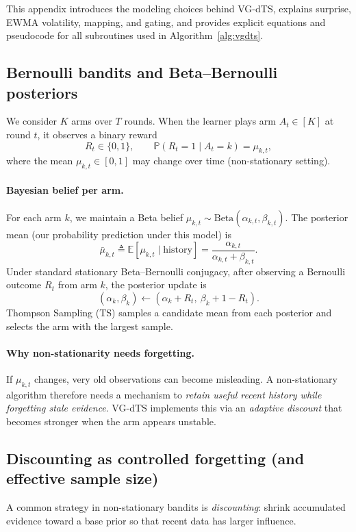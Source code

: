 This appendix introduces the modeling choices behind VG-dTS, explains surprise, EWMA volatility, mapping, and gating, and provides explicit equations and pseudocode for all subroutines used in Algorithm~\ref{alg:vgdts}.

\subsection{Bernoulli bandits and Beta--Bernoulli posteriors}
We consider $K$ arms over $T$ rounds. When the learner plays arm $A_t\in[K]$ at round $t$, it observes a binary reward
\[
R_t \in\{0,1\},\qquad \mathbb{P}(R_t=1\mid A_t=k)=\mu_{k,t},
\]
where the mean $\mu_{k,t}\in[0,1]$ may change over time (non-stationary setting).

\paragraph{Bayesian belief per arm.}
For each arm $k$, we maintain a Beta belief $\mu_{k,t}\sim\mathrm{Beta}(\alpha_{k,t},\beta_{k,t})$.
The posterior mean (our probability prediction under this model) is
\begin{equation}
\bar{\mu}_{k,t} \triangleq \mathbb{E}[\mu_{k,t}\mid \text{history}] = \frac{\alpha_{k,t}}{\alpha_{k,t}+\beta_{k,t}}.
\label{eq:apx_postmean}
\end{equation}
Under standard stationary Beta--Bernoulli conjugacy, after observing a Bernoulli outcome $R_t$ from arm $k$, the posterior update is
\begin{equation}
(\alpha_{k},\beta_{k}) \leftarrow (\alpha_{k}+R_t,\ \beta_{k}+1-R_t).
\label{eq:apx_conjugate}
\end{equation}
Thompson Sampling (TS) samples a candidate mean from each posterior and selects the arm with the largest sample.

\paragraph{Why non-stationarity needs forgetting.}
If $\mu_{k,t}$ changes, very old observations can become misleading. A non-stationary algorithm therefore needs a mechanism to \emph{retain useful recent history while forgetting stale evidence}.
VG-dTS implements this via an \emph{adaptive discount} that becomes stronger when the arm appears unstable.

\subsection{Discounting as controlled forgetting (and effective sample size)}
A common strategy in non-stationary bandits is \emph{discounting}: shrink accumulated evidence toward a base prior so that recent data has larger influence.

